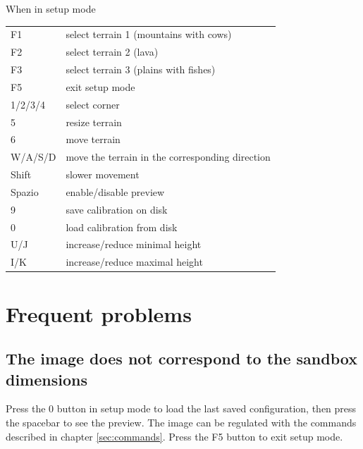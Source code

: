 \documentclass[12pt]{article}
\begin{document}
When in setup mode

\begin{tabular}{l l}
	F1      & select terrain 1 (mountains with cows)          \\
	F2      & select terrain 2 (lava)                         \\
	F3      & select terrain 3 (plains with fishes)           \\

	F5      & exit setup mode                                 \\

	1/2/3/4 & select corner                                   \\
	5       & resize terrain                                  \\
	6       & move terrain                                    \\

	W/A/S/D & move the terrain in the corresponding direction \\
	Shift   & slower movement                                 \\

	Spazio  & enable/disable preview                          \\

	9       & save calibration on disk                        \\
	0       & load calibration from disk                      \\

	U/J     & increase/reduce minimal height                  \\
	I/K     & increase/reduce maximal height                  \\
\end{tabular}

\section{Frequent problems}

\subsection{The image does not correspond to the sandbox dimensions}

Press the 0 button in setup mode to load the last saved configuration, then press the spacebar to see the preview.
The image can be regulated with the commands described in chapter \ref{sec:commands}. Press the F5 button to exit setup mode.\\
\end{document}
